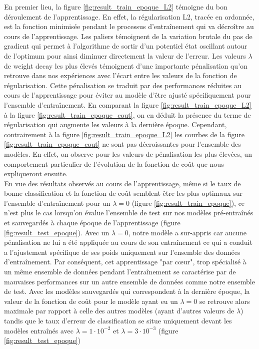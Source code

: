 \documentclass[12pt,english, openany]{book}
\begin{document}
En premier lieu, la figure \ref{fig:result_train_epoque_L2} témoigne du bon déroulement de l'apprentissage. En effet, la régularisation L2, tracée en ordonnée, est la fonction minimisée pendant le processus d'entraînement qui va décroître au cours de l'apprentissage. Les paliers témoignent de la variation brutale du pas de gradient qui permet à l'algorithme de sortir d'un potentiel état oscillant autour de l'optimum pour ainsi diminuer directement la valeur de l'erreur. Les valeurs $\lambda$ de weight decay les plus élevés témoignent d'une importante pénalisation qu'on retrouve dans nos expériences avec l'écart entre les valeurs de la fonction de régularisation. Cette pénalisation se traduit par des performances réduites au cours de l'apprentissage pour éviter au modèle d'être ajusté spécifiquement pour l'ensemble d'entraînement. En comparant la figure \ref{fig:result_train_epoque_L2} à la figure \ref{fig:result_train_epoque_cout}, on en déduit la présence du terme de régularisation qui augmente les valeurs à la dernière époque. Cependant, contrairement à la figure \ref{fig:result_train_epoque_L2} les courbes de la figure \ref{fig:result_train_epoque_cout} ne sont pas décroissantes pour l'ensemble des modèles. En effet, on observe pour les valeurs de pénalisation les plus élevées, un comportement particulier de l'évolution de la fonction de coût que nous expliqueront ensuite.\\

En vue des résultats observés au cours de l'apprentissage, même si le taux de bonne classification et la fonction de coût semblent être les plus optimaux sur l'ensemble d'entraînement pour un $\lambda = 0$ (figure \ref{fig:result_train_epoque}), ce n'est plus le cas lorsqu'on évalue l'ensemble de test sur nos modèles pré-entraînés et sauvegardés à chaque époque de l'apprentissage (figure \ref{fig:result_test_epoque}). Avec un $\lambda = 0$, notre modèle a sur-appris car aucune pénalisation ne lui a été appliquée au cours de son entraînement ce qui a conduit a l'ajustement spécifique de ses poids uniquement sur l'ensemble des données d'entraînement. Par conséquent, cet apprentissage "par cœur", trop spécialisé à un même ensemble de données pendant l'entraînement se caractérise par de mauvaises performances sur un autre ensemble de données comme notre ensemble de test. Avec les modèles sauvegardés qui correspondent à la dernière époque, la valeur de la fonction de coût pour le modèle ayant eu un $\lambda = 0$ se retrouve alors maximale par rapport à celle des autres modèles (ayant d'autres valeurs de $\lambda$) tandis que le taux d'erreur de classification se situe uniquement devant les modèles entraînés avec $\lambda = 1\cdot10^{-2}$ et $\lambda = 3\cdot 10^{-3}$ (figure \ref{fig:result_test_epoque}) \\
\end{document}
